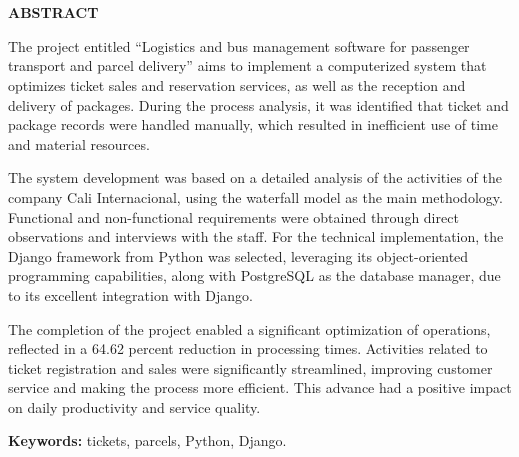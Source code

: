 \chapter*{}
\thispagestyle{plain}  %
\begin{center}
	{\bfseries\fontsize{13pt}{16pt}\selectfont ABSTRACT}
\end{center}

\vspace{1em}

The project entitled “Logistics and bus management software for passenger transport and parcel delivery” aims to implement a computerized system that optimizes ticket sales and reservation services, as well as the reception and delivery of packages. During the process analysis, it was identified that ticket and package records were handled manually, which resulted in inefficient use of time and material resources.

The system development was based on a detailed analysis of the activities of the company Cali Internacional, using the waterfall model as the main methodology. Functional and non-functional requirements were obtained through direct observations and interviews with the staff. For the technical implementation, the Django framework from Python was selected, leveraging its object-oriented programming capabilities, along with PostgreSQL as the database manager, due to its excellent integration with Django.

The completion of the project enabled a significant optimization of operations, reflected in a 64.62 percent reduction in processing times. Activities related to ticket registration and sales were significantly streamlined, improving customer service and making the process more efficient. This advance had a positive impact on daily productivity and service quality.

\vspace{1em}
\noindent\textbf{Keywords:} tickets, parcels, Python, Django.
